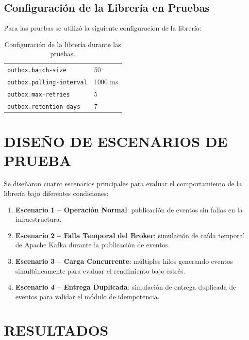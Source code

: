 \subsection{Configuración de la Librería en Pruebas}

Para las pruebas se utilizó la siguiente configuración de la librería:

\begin{table}[H]
    \centering
    \caption{Configuración de la librería durante las pruebas.}
    \small
    \begin{tabularx}{0.78\textwidth}{@{} l Y @{}}
        \toprule
         &  \\
        \midrule
        \texttt{outbox.batch-size} & 50 \\
        \texttt{outbox.polling-interval} & 1000 ms \\
        \texttt{outbox.max-retries} & 5 \\
        \texttt{outbox.retention-days} & 7 \\
        \bottomrule
    \end{tabularx}
    \label{tab:config_pruebas}
\end{table}

\section{DISEÑO DE ESCENARIOS DE PRUEBA}

Se diseñaron cuatro escenarios principales para evaluar el comportamiento de la librería bajo diferentes condiciones:

\begin{enumerate}
    \item \textbf{Escenario 1 -- Operación Normal}: publicación de eventos sin fallas en la infraestructura.
    \item \textbf{Escenario 2 -- Falla Temporal del Broker}: simulación de caída temporal de Apache Kafka durante la publicación de eventos.
    \item \textbf{Escenario 3 -- Carga Concurrente}: múltiples hilos generando eventos simultáneamente para evaluar el rendimiento bajo estrés.
    \item \textbf{Escenario 4 -- Entrega Duplicada}: simulación de entrega duplicada de eventos para validar el módulo de idempotencia.
\end{enumerate}

\section{RESULTADOS}

